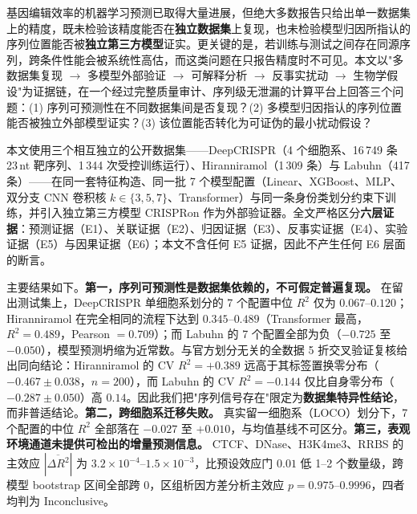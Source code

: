 基因编辑效率的机器学习预测已取得大量进展，但绝大多数报告只给出单一数据集上的精度，既未检验该精度能否在\textbf{独立数据集}上复现，也未检验模型归因所指认的序列位置能否被\textbf{独立第三方模型}证实。更关键的是，若训练与测试之间存在同源序列，跨条件性能会被系统性高估，而这类问题在只报告精度时不可见。本文以"多数据集复现 $\rightarrow$ 多模型外部验证 $\rightarrow$ 可解释分析 $\rightarrow$ 反事实扰动 $\rightarrow$ 生物学假设"为证据链，在一个经过完整质量审计、序列级无泄漏的计算平台上回答三个问题：(1) 序列可预测性在不同数据集间是否复现？(2) 多模型归因指认的序列位置能否被独立外部模型证实？(3) 该位置能否转化为可证伪的最小扰动假设？

本文使用三个相互独立的公开数据集——DeepCRISPR（4 个细胞系、16\,749 条 23\,nt 靶序列、1\,344 次受控训练运行）、Hiranniramol（1\,309 条）与 Labuhn（417 条）——在同一套特征构造、同一批 7 个模型配置（Linear、XGBoost、MLP、双分支 CNN 卷积核 $k\in\{3,5,7\}$、Transformer）与同一条身份类划分约束下训练，并引入独立第三方模型 CRISPRon 作为外部验证器。全文严格区分\textbf{六层证据}：预测证据（E1）、关联证据（E2）、归因证据（E3）、反事实证据（E4）、实验证据（E5）与因果证据（E6）；本文不含任何 E5 证据，因此不产生任何 E6 层面的断言。

主要结果如下。\textbf{第一，序列可预测性是数据集依赖的，不可假定普遍复现。} 在留出测试集上，DeepCRISPR 单细胞系划分的 7 个配置中位 $R^{2}$ 仅为 $0.067$--$0.120$；Hiranniramol 在完全相同的流程下达到 $0.345$--$0.489$（Transformer 最高，$R^{2}=0.489$，Pearson $=0.709$）；而 Labuhn 的 7 个配置全部为负（$-0.725$ 至 $-0.050$），模型预测坍缩为近常数。与官方划分无关的全数据 5 折交叉验证复核给出同向结论：Hiranniramol 的 CV $R^{2}=+0.389$ 远高于其标签置换零分布（$-0.467\pm0.038$，$n=200$），而 Labuhn 的 CV $R^{2}=-0.144$ 仅比自身零分布（$-0.287\pm0.050$）高 $0.14$。因此我们把"序列信号存在"限定为\textbf{数据集特异性结论}，而非普适结论。\textbf{第二，跨细胞系迁移失败。} 真实留一细胞系（LOCO）划分下，7 个配置的中位 $R^{2}$ 全部落在 $-0.027$ 至 $+0.010$，与均值基线不可区分。\textbf{第三，表观环境通道未提供可检出的增量预测信息。} CTCF、DNase、H3K4me3、RRBS 的主效应 $|\overline{\Delta R^{2}}|$ 为 $3.2\times10^{-4}$--$1.5\times10^{-3}$，比预设效应门 $0.01$ 低 1--2 个数量级，跨模型 bootstrap 区间全部跨 0，区组析因方差分析主效应 $p=0.975$--$0.9996$，四者均判为 Inconclusive。

